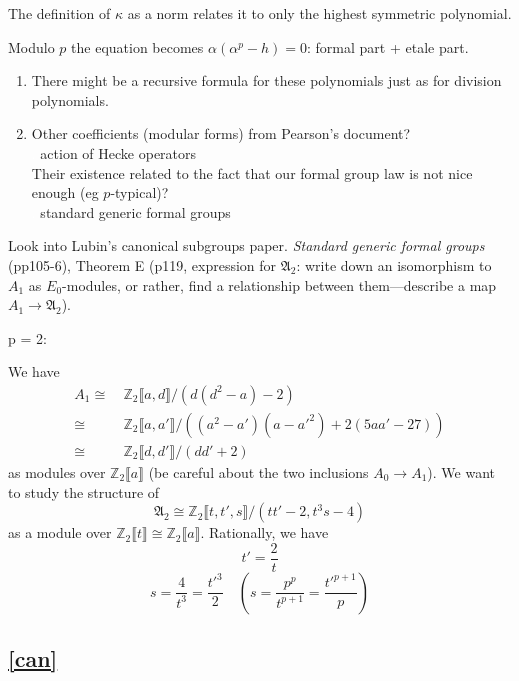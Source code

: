 \documentclass{rs}
\theoremstyle{definition}
\theoremstyle{remark}
\newcommand{\mb}[1]{\mathbb{#1}}
\newcommand{\mf}[1]{\mathfrak{#1}}
\newcommand{\BZ}{{\mb Z}}
\newcommand{\A}{\alpha}
\newcommand{\K}{\kappa}
\newcommand{\lb}{\llbracket}
\newcommand{\rb}{\rrbracket}
\numberwithin{equation}{section}
\numberwithin{thm}{section}
\begin{document}
The definition of $\K$ as a norm relates it to only the highest symmetric polynomial.  

Modulo $p$ the equation becomes $\A (\A^p - h) = 0$: formal part + etale part.  

\begin{enumerate}[\bf {Possibility} 1]
 \item There might be a recursive formula for these polynomials just as for division polynomials.  

 \item Other coefficients (modular forms) from Pearson's document?  \\
 \textcolor{white}{.} \hfill action of Hecke operators \\
 Their existence related to the fact that our formal group law is not nice enough (eg $p$-typical)?  \\
 \textcolor{white}{.} \hfill standard generic formal groups 
\end{enumerate}

Look into Lubin's canonical subgroups paper.  
{\em Standard generic formal groups} (pp105-6), 
Theorem E (p119, expression for $\mf A_2$: 
write down an isomorphism to $A_1$ as $E_0$-modules, 
or rather, find a relationship between them---describe a map $A_1 \to \mf A_2$).  

p = 2: 

We have 
\begin{equation*}
\begin{split}
 A_1 \cong & ~ \BZ_2 \lb a, d \rb / (d (d^2 - a) - 2) \\
     \cong & ~ \BZ_2 \lb a, a' \rb / ((a^2 - a') (a - a'^2) + 2 (5 a a' - 27)) \\
     \cong & ~ \BZ_2 \lb d, d' \rb / (d d' + 2) 
\end{split}
\end{equation*}
as modules over $\BZ_2 \lb a \rb$ (be careful about the two inclusions $A_0 \to A_1$).  
We want to study the structure of 
\[
 \mf A_2 \cong \BZ_2 \lb t, t', s \rb / (t t' - 2, t^3 s - 4) 
\]
as a module over $\BZ_2 \lb t \rb \cong \BZ_2 \lb a \rb$.  
Rationally, we have 
\[
 t' = \frac{2}{t} 
\]
\[
 s = \frac{4}{t^3} = \frac{t'^3}{2} \quad \left( s = \frac{p^p}{t^{p+1}} = \frac{t'^{p+1}}{p} \right) 
\]


\subsection{\href{http://www.ams.org/journals/tran/1979-251-00/S0002-9947-1979-0531971-4/S0002-9947-1979-0531971-4.pdf}{[can]}}
\end{document}
